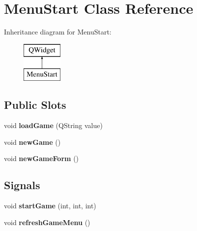 \hypertarget{class_menu_start}{}\section{Menu\+Start Class Reference}
\label{class_menu_start}
Inheritance diagram for Menu\+Start\+:\begin{figure}[H]
\begin{center}
\leavevmode
\includegraphics[height=2.000000cm]{class_menu_start}
\end{center}
\end{figure}
\subsection*{Public Slots}
\begin{DoxyCompactItemize}
\item 
\hypertarget{class_menu_start_a8af8ec946e4b575852937b469bfe3d59}{}void {\bfseries load\+Game} (Q\+String value)\label{class_menu_start_a8af8ec946e4b575852937b469bfe3d59}

\item 
\hypertarget{class_menu_start_a3ebce084546f1f9374a2e1cd0378d17a}{}void {\bfseries new\+Game} ()\label{class_menu_start_a3ebce084546f1f9374a2e1cd0378d17a}

\item 
\hypertarget{class_menu_start_a27892e476830d761fae92cc8b7db323f}{}void {\bfseries new\+Game\+Form} ()\label{class_menu_start_a27892e476830d761fae92cc8b7db323f}

\end{DoxyCompactItemize}
\subsection*{Signals}
\begin{DoxyCompactItemize}
\item 
\hypertarget{class_menu_start_a24c4dbfed1831cca70f027372846d484}{}void {\bfseries start\+Game} (int, int, int)\label{class_menu_start_a24c4dbfed1831cca70f027372846d484}

\item 
\hypertarget{class_menu_start_a277ad4799e66f6b7e314d159467bc963}{}void {\bfseries refresh\+Game\+Menu} ()\label{class_menu_start_a277ad4799e66f6b7e314d159467bc963}

\end{DoxyCompactItemize}

